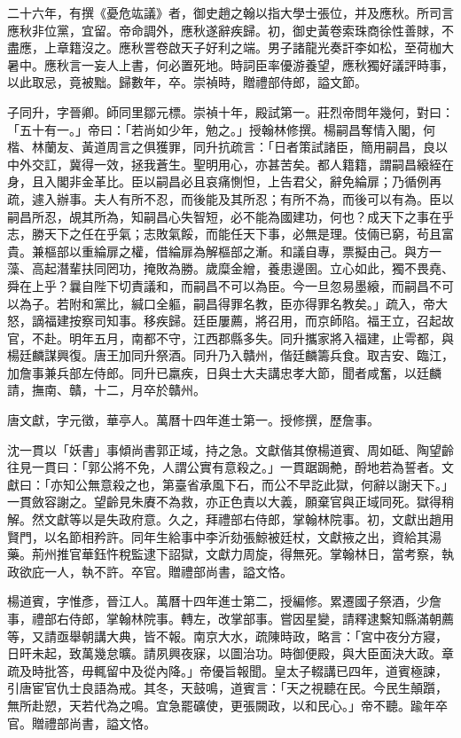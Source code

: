 \begin{pinyinscope}
{二十六年，有撰《憂危竑議》者，御史趙之翰以指大學士張位，并及應秋。所司言應秋非位黨，宜留。帝命調外，應秋遂辭疾歸。初，御史黃卷索珠商徐性善賕，不盡應，上章籍沒之。應秋詈卷啟天子好利之端。男子諸龍光奏訐李如松，至荷枷大暑中。應秋言一妄人上書，何必置死地。時詞臣率優游養望，應秋獨好議評時事，以此取忌，竟被黜。歸數年，卒。崇禎時，贈禮部侍郎，謚文節。

子同升，字晉卿。師同里鄒元標。崇禎十年，殿試第一。莊烈帝問年幾何，對曰：「五十有一。」帝曰：「若尚如少年，勉之。」授翰林修撰。楊嗣昌奪情入閣，何楷、林蘭友、黃道周言之俱獲罪，同升抗疏言：「日者策試諸臣，簡用嗣昌，良以中外交訌，冀得一效，拯我蒼生。聖明用心，亦甚苦矣。都人籍籍，謂嗣昌縗絰在身，且入閣非金革比。臣以嗣昌必且哀痛惻怛，上告君父，辭免綸扉；乃循例再疏，遽入辦事。夫人有所不忍，而後能及其所忍；有所不為，而後可以有為。臣以嗣昌所忍，覘其所為，知嗣昌心失智短，必不能為國建功，何也？成天下之事在乎志，勝天下之任在乎氣；志敗氣餒，而能任天下事，必無是理。伎倆已窮，茍且富貴。兼樞部以重綸扉之權，借綸扉為解樞部之漸。和議自專，票擬由己。與方一藻、高起潛輩扶同罔功，掩敗為勝。歲糜金繒，養患邊圉。立心如此，獨不畏堯、舜在上乎？曩自陛下切責議和，而嗣昌不可以為臣。今一旦忽易墨縗，而嗣昌不可以為子。若附和黨比，緘口全軀，嗣昌得罪名教，臣亦得罪名教矣。」疏入，帝大怒，謫福建按察司知事。移疾歸。廷臣屢薦，將召用，而京師陷。福王立，召起故官，不赴。明年五月，南都不守，江西郡縣多失。同升攜家將入福建，止雩都，與楊廷麟謀興復。唐王加同升祭酒。同升乃入贛州，偕廷麟籌兵食。取吉安、臨江，加詹事兼兵部左侍郎。同升已羸疾，日與士大夫講忠孝大節，聞者咸奮，以廷麟請，撫南、贛，十二，月卒於贛州。

唐文獻，字元徵，華亭人。萬曆十四年進士第一。授修撰，歷詹事。

沈一貫以「妖書」事傾尚書郭正域，持之急。文獻偕其僚楊道賓、周如砥、陶望齡往見一貫曰：「郭公將不免，人謂公實有意殺之。」一貫踞跼艴，酹地若為誓者。文獻曰：「亦知公無意殺之也，第臺省承風下石，而公不早訖此獄，何辭以謝天下。」一貫斂容謝之。望齡見朱賡不為救，亦正色責以大義，願棄官與正域同死。獄得稍解。然文獻等以是失政府意。久之，拜禮部右侍郎，掌翰林院事。初，文獻出趙用賢門，以名節相矜許。同年生給事中李沂劾張鯨被廷杖，文獻掖之出，資給其湯藥。荊州推官華鈺忤稅監逮下詔獄，文獻力周旋，得無死。掌翰林日，當考察，執政欲庇一人，執不許。卒官。贈禮部尚書，謚文恪。

楊道賓，字惟彥，晉江人。萬曆十四年進士第二，授編修。累遷國子祭酒，少詹事，禮部右侍郎，掌翰林院事。轉左，改掌部事。嘗因星變，請釋逮繫知縣滿朝薦等，又請亟舉朝講大典，皆不報。南京大水，疏陳時政，略言：「宮中夜分方寢，日旰未起，致萬幾怠曠。請夙興夜寐，以圖治功。時御便殿，與大臣面決大政。章疏及時批答，毋輒留中及從內降。」帝優旨報聞。皇太子輟講已四年，道賓極諫，引唐宦官仇士良語為戒。其冬，天鼓鳴，道賓言：「天之視聽在民。今民生顛躓，無所赴愬，天若代為之鳴。宜急罷礦使，更張闕政，以和民心。」帝不聽。踰年卒官。贈禮部尚書，謚文恪。

}
\end{pinyinscope}
